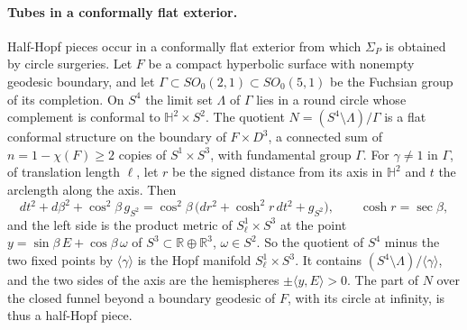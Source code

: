 \paragraph{Tubes in a conformally flat exterior.}
Half-Hopf pieces occur in a conformally flat exterior from which
\(\Sigma_P\) is obtained by circle surgeries. Let \(F\) be a compact
hyperbolic surface with nonempty geodesic boundary, and let
\(\Gamma\subset SO_0(2,1)\subset SO_0(5,1)\) be the Fuchsian group of
its completion. On \(S^4\) the limit set \(\Lambda\) of \(\Gamma\) lies
in a round circle whose complement is conformal to
\(\mathbb H^2\times S^2\). The quotient
\(N=(S^4\setminus\Lambda)/\Gamma\) is a flat conformal structure on the
boundary of \(F\times D^3\), a connected sum of \(n=1-\chi(F)\ge2\)
copies of \(S^1\times S^3\), with fundamental group \(\Gamma\). For
\(\gamma\ne1\) in \(\Gamma\), of translation length \(\ell\), let \(r\)
be the signed distance from its axis in \(\mathbb H^2\) and \(t\) the
arclength along the axis. Then
\begin{equation}\label{eq:hopf-coordinates}
 dt^2+d\beta^2+\cos^2\!\beta\,g_{S^2}
 =\cos^2\!\beta\,\big(dr^2+\cosh^2\!r\,dt^2+g_{S^2}\big),
 \qquad \cosh r=\sec\beta ,
\end{equation}
and the left side is the product metric of \(S^1_\ell\times S^3\) at
the point \(y=\sin\beta\,E+\cos\beta\,\omega\) of
\(S^3\subset\mathbb R\oplus\mathbb R^3\), \(\omega\in S^2\). So the
quotient of \(S^4\) minus the two fixed points by
\(\langle\gamma\rangle\) is the Hopf manifold \(S^1_\ell\times S^3\).
It contains \((S^4\setminus\Lambda)/\langle\gamma\rangle\), and the two
sides of the axis are the hemispheres \(\pm\langle y,E\rangle>0\).
The part of \(N\) over the closed funnel beyond a boundary geodesic of
\(F\), with its circle at infinity, is thus a half-Hopf piece.

